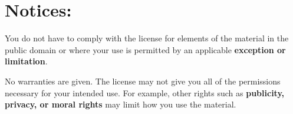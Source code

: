 \section*{Notices:}

You do not have to comply with the license for elements of the material in the
public domain or where your use is permitted by an applicable 
\textbf{exception or limitation}.

No warranties are given. The license may not give you all of the permissions
necessary for your intended use. For example, other rights such as 
\textbf{publicity, privacy, or moral rights} may limit how you use the material.
